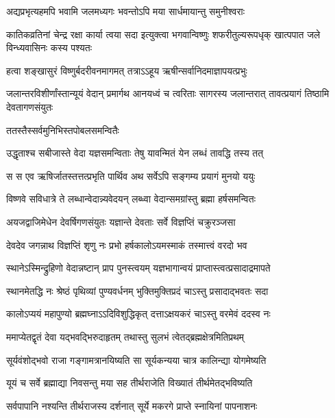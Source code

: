 \twolineshloka
{अद्यप्रभृत्यहमपि भवामि जलमध्यगः}
{भवन्तोऽपि मया सार्धमायान्तु समुनीश्वराः} %

\threelineshloka
{कातिकव्रतिनां चेन्द्र रक्षा कार्या त्वया सदा}
{इत्युक्त्वा भगवान्विष्णुः शफरीतुल्यरूपधृक्}
{खात्पपात जले विन्ध्यवासिनः कस्य पश्यतः} %

\twolineshloka
{हत्वा शङ्खासुरं विष्णुर्बदरीवनमागमत्}
{तत्राऽऽहूय ऋषीन्सर्वानिदमाज्ञापयत्प्रभुः} %


\threelineshloka
{जलान्तरविशीर्णांस्तान्यूयं वेदान् प्रमार्गथ}
{आनयध्वं च त्वरिताः सागरस्य जलान्तरात्}
{तावत्प्रयागं तिष्ठामि देवतागणसंयुतः} %



\onelineshloka
{ततस्तैस्सर्वमुनिभिस्तपोबलसमन्वितैः} %

\twolineshloka
{उद्धृताश्च सबीजास्ते वेदा यज्ञसमन्विताः}
{तेषु यावन्मितं येन लब्धं तावद्धि तस्य तत्} %

\twolineshloka
{स स एव ऋषिर्जातस्तत्तत्प्रभृति पार्थिव}
{अथ सर्वेऽपि सङ्गम्य प्रयागं मुनयो ययुः} %

\twolineshloka
{विष्णवे सविधात्रे ते लब्धान्वेदान्न्यवेदयन्}
{लब्ध्वा वेदान्समग्रांस्तु ब्रह्मा हर्षसमन्वितः} %

\twolineshloka
{अयजद्वाजिमेधेन देवर्षिगणसंयुतः}
{यज्ञान्ते देवताः सर्वे विज्ञप्तिं चक्रुरञ्जसा} %


\twolineshloka
{देवदेव जगन्नाथ विज्ञप्तिं शृणु नः प्रभो}
{हर्षकालोऽयमस्माकं तस्मात्त्वं वरदो भव} %

\twolineshloka
{स्थानेऽस्मिन्द्रुहिणो वेदान्नष्टान् प्राप पुनस्त्वयम्}
{यज्ञभागान्वयं प्राप्तास्त्वत्प्रसादाद्रमापते} %

\twolineshloka
{स्थानमेतद्धि नः श्रेष्ठं पृथिव्यां पुण्यवर्धनम्}
{भुक्तिमुक्तिप्रदं चाऽस्तु प्रसादाद्भवतः सदा} %

\twolineshloka
{कालोऽप्ययं महापुण्यो ब्रह्मघ्नाऽऽदिविशुद्धिकृत्}
{दत्ताऽक्षयकरं चाऽस्तु वरमेवं ददस्व नः} %


\twolineshloka
{ममाप्येतद्वृतं देवा यद्भवद्भिरुदाहृतम्}
{तथास्तु सुलभं त्वेतद्ब्रह्मक्षेत्रमितिप्रथम्} %

\twolineshloka
{सूर्यवंशोद्भवो राजा गङ्गामत्रानयिष्यति}
{सा सूर्यकन्यया चात्र कालिन्द्या योगमेष्यति} %

\twolineshloka
{यूयं च सर्वे ब्रह्माद्या निवसन्तु मया सह}
{तीर्थराजेति विख्यातं तीर्थमेतद्भविष्यति} %

\twolineshloka
{सर्वपापानि नश्यन्ति तीर्थराजस्य दर्शनात्}
{सूर्ये मकरगे प्राप्ते स्नायिनां पापनाशनः} %

